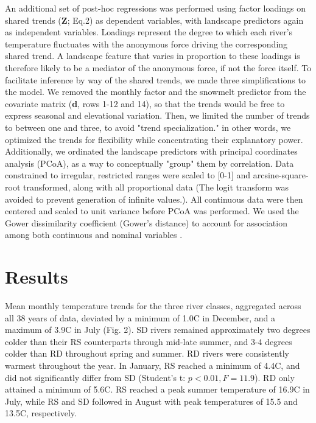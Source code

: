 \documentclass[notitlepage]{article}
\begin{document}
An additional set of post-hoc regressions was performed using factor loadings on shared trends (\textbf{Z}; Eq.2) as dependent variables, with landscape predictors again as independent variables. Loadings represent the degree to which each river's temperature fluctuates with the anonymous force driving the corresponding shared trend. A landscape feature that varies in proportion to these loadings is therefore likely to be a mediator of the anonymous force, if not the force itself. To facilitate inference by way of the shared trends, we made three simplifications to the model. We removed the monthly factor and the snowmelt predictor from the covariate matrix (\textbf{d}, rows 1-12 and 14), so that the trends would be free to express seasonal and elevational variation. Then, we  limited the number of trends to between one and three, to avoid "trend specialization." in other words, we optimized the trends for flexibility while concentrating their explanatory power. Additionally, we ordinated the landscape predictors with principal coordinates analysis (PCoA), as a way to conceptually "group" them by correlation. Data constrained to irregular, restricted ranges were scaled to [0-1] and arcsine-square-root transformed, along with all proportional data (The logit transform was avoided to prevent generation of infinite values.). All continuous data were then centered and scaled to unit variance before PCoA was performed. We used the Gower dissimilarity coefficient (Gower's distance) to account for association among both continuous and nominal variables \citep{gowerDist}.

\section*{Results} %

Mean monthly temperature trends for the three river classes, aggregated across all 38 years of data, deviated by a minimum of 1.0\degree C in December, and a maximum of 3.9\degree C in July (Fig. 2). SD rivers remained approximately two degrees colder than their RS counterparts through mid-late summer, and 3-4 degrees colder than RD throughout spring and summer. RD rivers were consistently warmest throughout the year. In January, RS reached a minimum of 4.4\degree C, and did not significantly differ from SD (Student's t: $p<0.01, F=11.9$). RD only attained a minimum of 5.6\degree C. RS reached a peak summer temperature of 16.9\degree C in July, while RS and SD followed in August with peak temperatures of 15.5 and 13.5\degree C, respectively.
\end{document}
